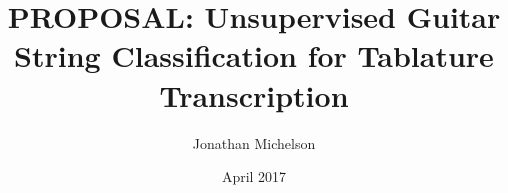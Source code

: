 \documentclass[12pt]{cmuthesis}
\begin{document}
 
\frontmatter

\pagestyle{empty}

\title{ %
{\bf PROPOSAL: Unsupervised Guitar String Classification for Tablature Transcription}}
\author{Jonathan Michelson}
\date{April 2017}
\trnumber{}


\support{}
\disclaimer{}



\maketitle


\pagestyle{plain} %






\end{document}
